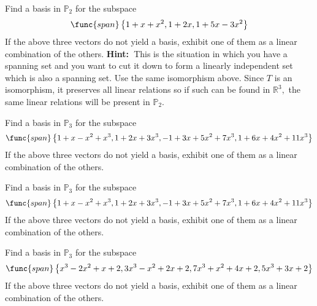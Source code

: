 \begin{enumialphparenastyle}
\begin{ex} Find a basis in $\mathbb{P}_{2}$ for the subspace 
\begin{equation*}
\func{span}\left\{ 1+x+x^{2},1+2x,1+5x-3x^{2}\right\}
\end{equation*}
If the above three vectors do not yield a basis, exhibit one of them as a
linear combination of the others. \textbf{Hint:\ }This is the situation in
which you have a spanning set and you want to cut it down to form a linearly
independent set which is also a spanning set. Use the same isomorphism
above. Since $T$ is an isomorphism, it preserves all linear relations so if
such can be found in $\mathbb{R}^{3},$ the same linear relations will be
present in $\mathbb{P}_{2}$.
\end{ex}


\begin{ex} Find a basis in $\mathbb{P}_{3}$ for the subspace 
\begin{equation*}
\func{span}\left\{
1+x-x^{2}+x^{3},1+2x+3x^{3},-1+3x+5x^{2}+7x^{3},1+6x+4x^{2}+11x^{3}\right\}
\end{equation*}
If the above three vectors do not yield a basis, exhibit one of them as a
linear combination of the others.
\end{ex}


\begin{ex} Find a basis in $\mathbb{P}_{3}$ for the subspace 
\begin{equation*}
\func{span}\left\{
1+x-x^{2}+x^{3},1+2x+3x^{3},-1+3x+5x^{2}+7x^{3},1+6x+4x^{2}+11x^{3}\right\}
\end{equation*}
If the above three vectors do not yield a basis, exhibit one of them as a
linear combination of the others.
\end{ex}


\begin{ex} Find a basis in $\mathbb{P}_{3}$ for the subspace 
\begin{equation*}
\func{span}\left\{
x^{3}-2x^{2}+x+2,3x^{3}-x^{2}+2x+2,7x^{3}+x^{2}+4x+2,5x^{3}+3x+2\right\}
\end{equation*}
If the above three vectors do not yield a basis, exhibit one of them as a
linear combination of the others.
\end{ex}



\end{enumialphparenastyle}
